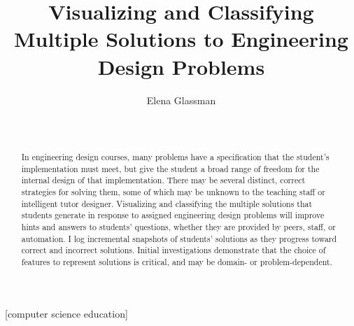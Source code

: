 \documentclass{sig-alternate-2013}
\begin{document}
\pagestyle{empty}
\title{Visualizing and Classifying Multiple Solutions to Engineering Design Problems}

\author{
 \alignauthor Elena Glassman \\
  \\
  \\
}

\maketitle

\begin{abstract}
In engineering design courses, many problems have a specification that the student's implementation must meet, but give the student a broad range of freedom for the internal design of that implementation. There may be several distinct, correct strategies for solving them, some of which may be unknown to the teaching staff or intelligent tutor designer. Visualizing and classifying the multiple solutions that students generate in response to assigned engineering design problems will improve hints and answers to students' questions, whether they are provided by peers, staff, or automation. I log incremental snapshots of students' solutions as they progress toward correct and incorrect solutions. Initial investigations demonstrate that the choice of features to represent solutions is critical, and may be domain- or problem-dependent.
\end{abstract}

%

[computer science education]


\end{document}
